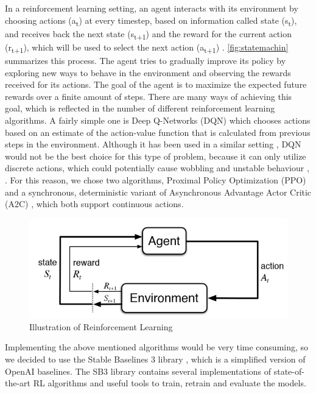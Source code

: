 \documentclass{article}
\begin{document}
In a reinforcement learning setting, an agent interacts with its environment by choosing actions (a\textsubscript{t}) at every timestep, based on information called state (s\textsubscript{t}), and receives back the next state (s\textsubscript{t+1}) and the reward for the current action (r\textsubscript{t+1}), which will be used to select the next action (a\textsubscript{t+1}) \cite{dlr_book}. \autoref{fig:statemachin} summarizes this process. 
The agent tries to gradually improve its policy by exploring new ways to behave in the environment and observing the rewards received for its actions. The goal of the agent is to maximize the expected future rewards over a finite amount of steps. 
There are many ways of achieving this goal, which is reflected in the number of different reinforcement learning algorithms. A fairly simple one is Deep Q-Networks (DQN) \cite{DBLP:journals/corr/MnihKSGAWR13} which chooses actions based on an estimate of the action-value function that is calculated from previous steps in the environment. 
Although it has been used in a similar setting \cite{DBLP:journals/corr/abs-2009-11212}, DQN would not be the best choice for this type of problem, because it can only utilize discrete actions, which could potentially cause wobbling and unstable behaviour \cite{DBLP:journals/corr/abs-1807-02371}, \cite{DBLP:journals/corr/abs-1911-12905}. For this reason, we chose two algorithms, Proximal Policy Optimization (PPO) \cite{DBLP:journals/corr/SchulmanWDRK17} and a synchronous, deterministic variant of Asynchronous Advantage Actor Critic (A2C) \cite{DBLP:journals/corr/MnihBMGLHSK16}, which both support continuous actions.

\begin{figure}[h!]
	\centering
	\includegraphics[width=0.8\linewidth]{rl.jpg}
	\caption{Illustration of Reinforcement Learning}
	\label{fig:statemachin}
\end{figure}

Implementing the above mentioned algorithms would be very time consuming, so we decided to use the Stable Baselines 3 library \cite{stablebase}, which is a simplified version of OpenAI baselines. The SB3 library contains several implementations of state-of-the-art RL algorithms and useful tools to train, retrain and evaluate the models.
\end{document}
